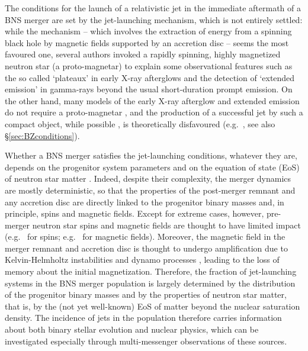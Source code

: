 \documentclass[]{aa}
\newcommand{\resp}[1]{#1}
\begin{document}
The conditions for the launch of a relativistic jet in the immediate aftermath of a BNS merger are set by the jet-launching mechanism, which is not entirely settled: while the \citet{Blandford1977} mechanism -- which involves the extraction of energy from a spinning black hole by magnetic fields supported by an accretion disc -- seems the most favoured one, several authors \citep[e.g.][]{Dai1998,Zhang2001,Metzger2008,DallOsso2011,Bernardini2012a,Bernardini2012b,Bernardini2013,Rowlinson2013,Gompertz2013,Stratta2018,Strang2019,Sarin2020} invoked a rapidly spinning, highly magnetized neutron star (a proto-magnetar) to explain some observational features such as the so called `plateaux' \citep{Nousek2006} in early X-ray afterglows and the detection of `extended emission' \citep{Norris2006} in gamma-rays beyond the usual short-duration prompt emission.  On the other hand, many models of the early X-ray afterglow and extended emission do not require a proto-magnetar \citep[e.g.][]{Rees1998,Zhang2006,Genet2007,Yamazaki2009,Leventis2014,Duffell2015,Beniamini2020,Oganesyan2020,Ascenzi2020,Barkov2021,Duque2021arXiv}, and the production of a successful jet by such a compact object, while possible \citep{Usov1992,Thompson1994,Thompson2004,Metzger2011,Mosta2020}, is theoretically disfavoured (e.g.~\citealt{Ciolfi2020_nomagnetar}, see also \S\ref{sec:BZconditions}). 

Whether a BNS merger satisfies the jet-launching conditions, whatever they are, depends on the \resp{progenitor system parameters} and on the equation of state (EoS) of neutron star matter \citep{Fryer2015,Piro2017}. \resp{Indeed,} despite their complexity, the merger dynamics are mostly deterministic, so \resp{that} the properties of the post-merger remnant and any accretion disc are directly linked to the progenitor binary masses and, in principle, spins and magnetic fields. Except for extreme cases, however, pre-merger neutron star spins and magnetic fields are thought to have limited impact (e.g.~\citealt{East2019,Dudi2021,Papenfort2022} for spins; e.g.~\citealt{Giacomazzo2009,Lira2022} for magnetic fields). Moreover, the magnetic field in the merger remnant and accretion disc is thought to undergo amplification due to Kelvin-Helmholtz instabilities and dynamo processes \citep[e.g.][]{Kiuchi2014,Kiuchi2015,Palenzuela2021}, leading to the loss of memory about the initial magnetization.
Therefore, the fraction of jet-launching systems in the BNS merger population is largely determined by the distribution of the progenitor binary masses and by the properties of neutron star matter, that is, by the (not yet well-known) EoS of matter beyond the nuclear saturation density. The incidence of jets in the population therefore carries information about both binary stellar evolution and nuclear physics, which can be investigated especially through multi-messenger observations of these sources. 
\end{document}
